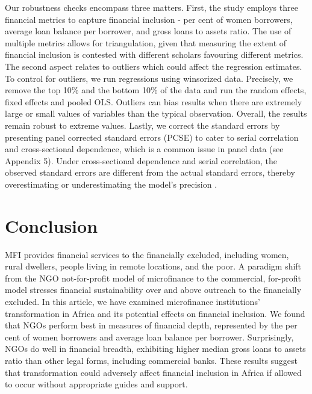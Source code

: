 \documentclass[a4paper, nobind]{templates/ociamthesis}
\begin{document}
Our robustness checks encompass three matters. First, the study employs three financial metrics to capture financial inclusion - per cent of women borrowers, average loan balance per borrower, and gross loans to assets ratio. The use of multiple metrics allows for triangulation, given that measuring the extent of financial inclusion is contested with different scholars favouring different metrics. The second aspect relates to outliers which could affect the regression estimates. To control for outliers, we run regressions using winsorized data. Precisely, we remove the top 10\% and the bottom 10\% of the data and run the random effects, fixed effects and pooled OLS. Outliers can bias results when there are extremely large or small values of variables than the typical observation. Overall, the results remain robust to extreme values. Lastly, we correct the standard errors by presenting panel corrected standard errors (PCSE) to cater to serial correlation and cross-sectional dependence, which is a common issue in panel data (see Appendix 5). Under cross-sectional dependence and serial correlation, the observed standard errors are different from the actual standard errors, thereby overestimating or underestimating the model's precision \autocite{pesaran2021general}.

\hypertarget{conclusion-1}{%
\section{Conclusion}\label{conclusion-1}}

MFI provides financial services to the financially excluded, including women, rural dwellers, people living in remote locations, and the poor. A paradigm shift from the NGO not-for-profit model of microfinance to the commercial, for-profit model stresses financial sustainability over and above outreach to the financially excluded. In this article, we have examined microfinance institutions' transformation in Africa and its potential effects on financial inclusion. We found that NGOs perform best in measures of financial depth, represented by the per cent of women borrowers and average loan balance per borrower. Surprisingly, NGOs do well in financial breadth, exhibiting higher median gross loans to assets ratio than other legal forms, including commercial banks. These results suggest that transformation could adversely affect financial inclusion in Africa if allowed to occur without appropriate guides and support.
\end{document}
